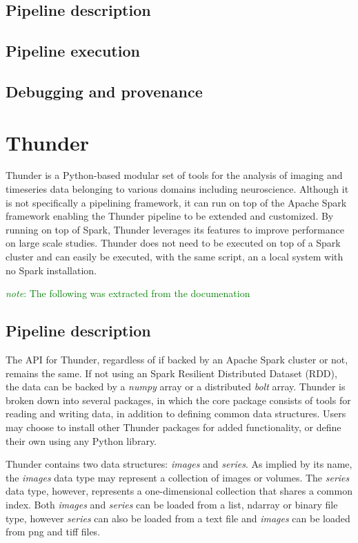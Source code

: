 \documentclass{report}
\newcommand{\note}[1]{\textcolor{green}{\textit{note}: #1}}
\begin{document}
        \subsection{Pipeline description}
         
        \subsection{Pipeline execution}
        \subsection{Debugging and provenance}
    \section{Thunder}

        Thunder is a Python-based modular set of tools for the analysis of imaging and timeseries data belonging
        to various domains including neuroscience. Although it is not specifically a pipelining framework, 
        it can run on top of the Apache
        Spark framework enabling the Thunder pipeline to be extended and customized. By running on top of Spark,
        Thunder leverages its features to improve performance on large scale studies. Thunder does not need to
        be executed on top of a Spark cluster and can easily be executed, with the same script, an a local system
        with no Spark installation. 

        \note{The following was extracted from the documenation}
        \subsection{Pipeline description}
        The API for Thunder, regardless of if backed by an Apache Spark cluster or not, remains the same. If not 
        using an Spark Resilient Distributed Dataset (RDD), the data can be backed by a \textit{numpy} array or a
        distributed \textit{bolt} array. Thunder is broken down into several packages, in which the core package
        consists of tools for reading and writing data, in addition to defining common data structures. Users may
        choose to install other Thunder packages for added functionality, or define their own using any Python
        library.        
 

        Thunder contains two data structures: \textit{images} and \textit{series}. As implied by its name, the 
        \textit{images} data type may represent a collection of images or volumes. 
        The \textit{series} data type,
        however, represents a one-dimensional collection that shares a common index. Both \textit{images} and 
        \textit{series} can be loaded from a list, ndarray or binary file type, however \textit{series} can also 
        be loaded from a text file and \textit{images} can be loaded from png and tiff files.
\end{document}
